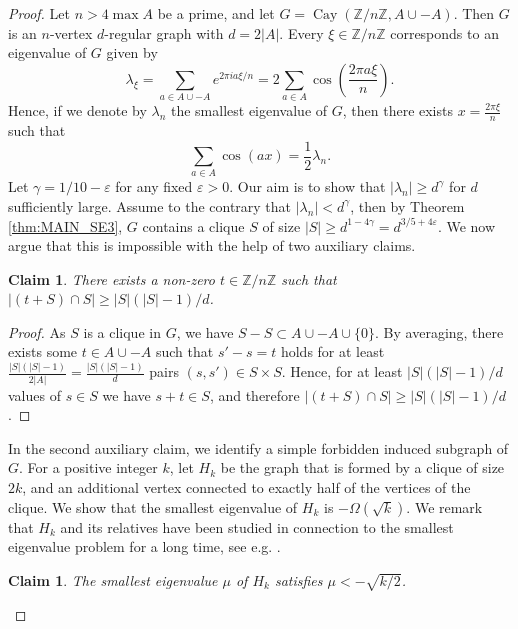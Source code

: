 \documentclass[11pt]{article}
\theoremstyle{plain}
\newtheorem{claim}[theorem]{Claim}
\theoremstyle{definition}
\newcommand{\eps}{\varepsilon}
\DeclareMathOperator{\Cay}{Cay}
\begin{document}
\begin{proof}
    Let $n>4\max A$ be a prime, and let $G=\Cay(\mathbb{Z}/n\mathbb{Z}, A\cup -A)$.
    Then $G$ is an $n$-vertex $d$-regular graph with $d=2|A|$. 
    Every $\xi\in \mathbb{Z}/n\mathbb{Z}$ corresponds to an eigenvalue of $G$ given by
    $$\lambda_\xi=\sum_{a\in A\cup -A}e^{2\pi i a \xi /n}= 2\sum_{a \in A} \cos\left(\frac{2\pi a\xi}{n} \right).$$
    Hence, if we denote by $\lambda_n$ the smallest eigenvalue of $G$, then there exists $x=\frac{2\pi \xi}{n}$ such that $$\sum_{a\in A}\cos(ax)=\frac{1}{2}\lambda_n.$$
    Let $\gamma=1/10-\eps$ for any fixed $\eps>0$. Our aim is to show that $|\lambda_n|\geq d^{\gamma}$ for $d$ sufficiently large. 
    Assume to the contrary that $|\lambda_n|< d^{\gamma}$, then by Theorem \ref{thm:MAIN_SE3}, $G$ contains a clique $S$ of size $|S|\geq d^{1-4\gamma}=d^{3/5+4\eps}$. We now argue that this is impossible with the help of two auxiliary claims. 
    
    \begin{claim}\label{claim:clique_int}
        There exists a non-zero $t\in \mathbb{Z}/n\mathbb{Z}$ such that $|(t+S)\cap S|\geq |S|(|S|-1)/d$.
    \end{claim}
    
    \begin{proof}
        As $S$ is a clique in $G$, we have $S-S\subset A\cup -A\cup\{0\}$. 
        By averaging, there exists some $t\in A\cup -A$ such that $s'-s=t$ holds for at least $\frac{|S|(|S|-1)}{2|A|}=\frac{|S|(|S|-1)}{d}$ pairs $(s,s')\in S\times S$. 
        Hence, for at least $|S|(|S|-1)/d$ values of $s\in S$ we have $s+t\in S$, and therefore $|(t+S)\cap S|\geq |S|(|S|-1)/d$.
    \end{proof}
    
    In the second auxiliary claim, we identify a simple forbidden induced subgraph of $G$. For a positive integer $k$, let $H_k$ be the graph that is formed by a clique of size $2k$, and an additional vertex connected to exactly half of the vertices of the clique. We show that the smallest eigenvalue of $H_k$ is $-\Omega(\sqrt{k})$. We remark that $H_k$ and its relatives have been studied in connection to the smallest eigenvalue problem for a long time, see e.g. \cite{H73}.
    
    \begin{claim}\label{claim:H_k}
        The smallest eigenvalue $\mu$ of $H_k$ satisfies $\mu<-\sqrt{k/2}$. 
    \end{claim}
    

\end{proof}
\end{document}
